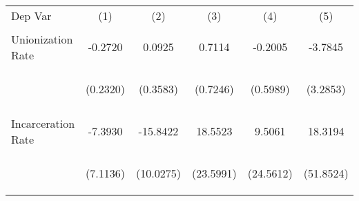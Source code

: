 \begin{center}
\begin{tabular}{lccccc}
\hline \noalign{\smallskip}Dep Var & (1) & (2) & (3) & (4) & (5)\\
\noalign{\smallskip}\hline \noalign{\smallskip}Unionization Rate & \begin{scriptsize}-0.2720\end{scriptsize} & \begin{scriptsize}0.0925\end{scriptsize} & \begin{scriptsize}0.7114\end{scriptsize} & \begin{scriptsize}-0.2005\end{scriptsize} & \begin{scriptsize}-3.7845\end{scriptsize}\\
 & \begin{scriptsize}(0.2320)\end{scriptsize} & \begin{scriptsize}(0.3583)\end{scriptsize} & \begin{scriptsize}(0.7246)\end{scriptsize} & \begin{scriptsize}(0.5989)\end{scriptsize} & \begin{scriptsize}(3.2853)\end{scriptsize}\\
\noalign{\smallskip}Incarceration Rate & \begin{scriptsize}-7.3930\end{scriptsize} & \begin{scriptsize}-15.8422\end{scriptsize} & \begin{scriptsize}18.5523\end{scriptsize} & \begin{scriptsize}9.5061\end{scriptsize} & \begin{scriptsize}18.3194\end{scriptsize}\\
 & \begin{scriptsize}(7.1136)\end{scriptsize} & \begin{scriptsize}(10.0275)\end{scriptsize} & \begin{scriptsize}(23.5991)\end{scriptsize} & \begin{scriptsize}(24.5612)\end{scriptsize} & \begin{scriptsize}(51.8524)\end{scriptsize}\\

\end{tabular}
\end{center}
